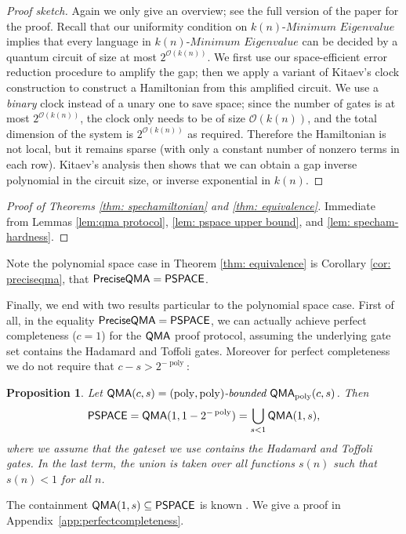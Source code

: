 \documentclass[a4paper,UKenglish]{lipics-v2016}
\newtheorem{proposition}[theorem]{Proposition}
\newcommand\QMA{{\sf{QMA}}}
\newcommand\PSPACE{{\sf{PSPACE}}}
\newcommand\preciseQMA{{\sf{PreciseQMA}}}
\newcommand\bddQMA[5]{{\left(#1,#2\right)}\textit{-bounded }\QMA_{#3}(#4,#5)}
\newcommand\spechamiltonian[1]{\ensuremath{#1}\textit{-Minimum Eigenvalue}}
\newcommand\bigoh{\mathcal{O}}
\DeclareMathOperator{\poly}{poly}
\begin{document}
\begin{proof}[Proof sketch]
Again we only give an overview; see the full version of the paper for the  proof. Recall that our uniformity condition on $\spechamiltonian{k(n)}$ implies that every language in $\spechamiltonian{k(n)}$ can be decided by a quantum circuit of size at most $2^{\bigoh(k(n))}$. We first use our space-efficient error reduction procedure to amplify the gap; then we apply a variant of Kitaev's clock construction \cite{ksv02} to construct a Hamiltonian from this amplified circuit. We use a \emph{binary} clock instead of a unary one to save space; since the number of gates is at most $2^{\bigoh(k(n))}$, the clock only needs to be of size $\bigoh(k(n))$, and the total dimension of the system is $2^{\bigoh(k(n))}$ as required. Therefore the Hamiltonian is not local, but it remains sparse (with only a constant number of nonzero terms in each row). Kitaev's analysis then shows that we can obtain a gap inverse polynomial in the circuit size, or inverse exponential in $k(n)$.
\end{proof}

\begin{proof}[Proof of Theorems \ref{thm: spechamiltonian} and \ref{thm: equivalence}]
Immediate from Lemmas \ref{lem:qma protocol}, \ref{lem: pspace upper bound}, and \ref{lem: specham-hardness}.
\end{proof}

Note the polynomial space case in Theorem \ref{thm: equivalence} is Corollary \ref{cor: preciseqma}, that $\preciseQMA=\PSPACE$.

Finally, we end with two results particular to the polynomial space case. First of all, in the equality $\preciseQMA=\PSPACE$, we can actually achieve perfect completeness ($c=1$) for the $\QMA$ proof protocol, assuming the underlying gate set contains the Hadamard and Toffoli gates. Moreover for perfect completeness we do not require that $c-s > 2^{-\poly}$:
\begin{proposition} \label{prop: perfect completeness} Let $\QMA(c,s) = \bddQMA{\poly}{\poly}{\poly}{c}{s}$. Then
\begin{equation}
\PSPACE = \QMA(1,1-2^{-\poly}) = \bigcup_{s < 1}\QMA(1,s), \nonumber
\end{equation}
where we assume that the gateset we use contains the Hadamard and Toffoli gates. In the last term, the union is taken over all functions $s(n)$ such that $s(n) < 1$ for all $n$.
\end{proposition}
The containment $\QMA(1,s) \subseteq \PSPACE$ is known \cite{ikw12}. We give a proof in Appendix~\ref{app:perfectcompleteness}.
\end{document}

